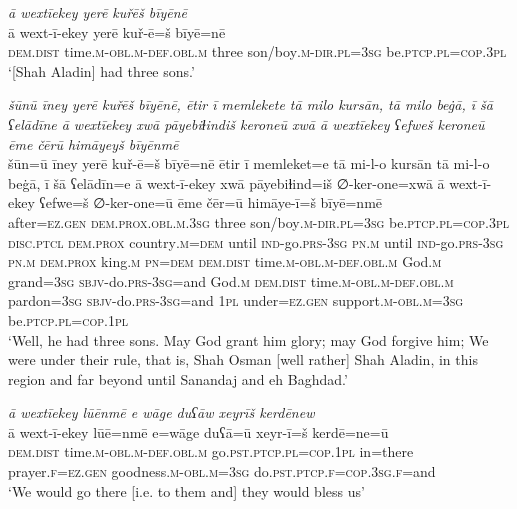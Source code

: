 \ea \label{DG.3}
\textit{ā wextīekey yerē kuřēš bīyēnē} \\ 
\gll ā wext-ī-ekey yerē kuř-ē=š bīyē=nē \\ 
 \textsc{dem.dist} time\textsc{.m}\textsc{-obl}\textsc{.m}\textsc{-def}\textsc{.obl}\textsc{.m} three son/boy\textsc{.m}\textsc{-dir}\textsc{.pl}\textsc{=3sg} be\textsc{.ptcp}\textsc{.pl}\textsc{=cop}\textsc{.3pl} \\ 
\glt `[Shah Aladin] had three sons.'
\z 
 
\ea \label{DG.4}
\textit{šūnū īney yerē kuřēš bīyēnē, ētir ī memlekete tā milo kursān, tā milo beġā, ī šā ʕelādīne ā wextīekey xwā pāyebiɫindiš keroneū xwā ā wextīekey ʕefweš keroneū ēme čērū himāyeyš bīyēnmē} \\ 
\gll šūn=ū īney yerē kuř-ē=š bīyē=nē ētir ī memleket=e tā mi-l-o kursān tā mi-l-o beġā, ī šā ʕelādīn=e ā wext-ī-ekey xwā pāyebiɫind=iš ∅-ker-one=xwā ā wext-ī-ekey ʕefwe=š ∅-ker-one=ū ēme čēr=ū himāye-ī=š bīyē=nmē \\ 
 after\textsc{=ez}\textsc{.gen} \textsc{dem.prox}\textsc{.obl}\textsc{.m}\textsc{.3sg} three son/boy\textsc{.m}\textsc{-dir}\textsc{.pl}\textsc{=3sg} be\textsc{.ptcp}\textsc{.pl}\textsc{=cop}\textsc{.3pl} \textsc{disc.ptcl} \textsc{dem.prox} country\textsc{.m}\textsc{=dem} until \textsc{ind-}go\textsc{.prs}\textsc{-3sg} \textsc{pn}\textsc{.m} until \textsc{ind-}go\textsc{.prs}\textsc{-3sg} \textsc{pn}\textsc{.m} \textsc{dem.prox} king\textsc{.m} \textsc{pn}\textsc{=dem} \textsc{dem.dist} time\textsc{.m}\textsc{-obl}\textsc{.m}\textsc{-def}\textsc{.obl}\textsc{.m} God\textsc{.m} grand\textsc{=3sg} \textsc{sbjv-}do\textsc{.prs}\textsc{-3sg}=and God\textsc{.m} \textsc{dem.dist} time\textsc{.m}\textsc{-obl}\textsc{.m}\textsc{-def}\textsc{.obl}\textsc{.m} pardon\textsc{=3sg} \textsc{sbjv-}do\textsc{.prs}\textsc{-3sg}=and \textsc{1pl} under\textsc{=ez}\textsc{.gen} support\textsc{.m}\textsc{-obl}\textsc{.m}\textsc{=3sg} be\textsc{.ptcp}\textsc{.pl}\textsc{=cop}\textsc{.1pl} \\ 
\glt `Well, he had three sons. May God grant him glory; may God forgive him; We were under their rule, that is, Shah Osman [well rather] Shah Aladin, in this region and far beyond until Sanandaj and eh Baghdad.'
\z 
 
\ea \label{DG.6}
\textit{ā wextīekey lūēnmē e wāge duʕāw xeyrīš kerdēnew} \\ 
\gll ā wext-ī-ekey lūē=nmē e=wāge duʕā=ū xeyr-ī=š kerdē=ne=ū \\ 
 \textsc{dem.dist} time\textsc{.m}\textsc{-obl}\textsc{.m}\textsc{-def}\textsc{.obl}\textsc{.m} go\textsc{.pst}\textsc{.ptcp}\textsc{.pl}\textsc{=cop}\textsc{.1pl} in=there prayer\textsc{\textsc{.f}}\textsc{=ez}\textsc{.gen} goodness\textsc{.m}\textsc{-obl}\textsc{.m}\textsc{=3sg} do\textsc{.pst}\textsc{.ptcp}\textsc{\textsc{.f}}\textsc{=cop}\textsc{.3sg}\textsc{\textsc{.f}}=and \\ 
\glt `We would go there [i.e. to them and] they would bless us'
\z 
 
